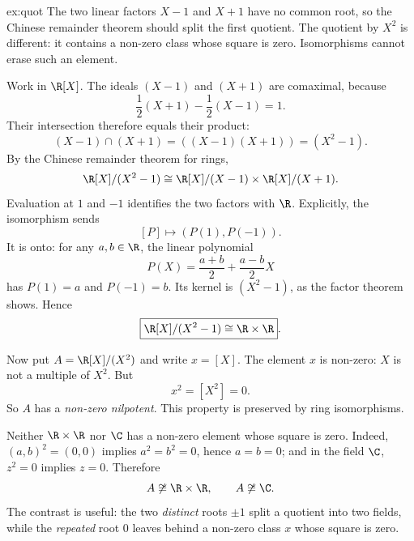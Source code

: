 \begin{solution}{ex:quot}
\idea The two linear factors $X-1$ and $X+1$ have no common root, so the Chinese remainder theorem should split the first quotient. The quotient by $X^2$ is different: it contains a non-zero class whose square is zero. Isomorphisms cannot erase such an element.

\writeup Work in $\R[X]$. The ideals $(X-1)$ and $(X+1)$ are comaximal, because
\[
\frac12(X+1)-\frac12(X-1)=1.
\]
Their intersection therefore equals their product:
\[
(X-1)\cap(X+1)=((X-1)(X+1))=(X^2-1).
\]
By the Chinese remainder theorem for rings,
\[
\R[X]/(X^2-1)
\cong\R[X]/(X-1)\times\R[X]/(X+1).
\]
Evaluation at $1$ and $-1$ identifies the two factors with $\R$. Explicitly, the isomorphism sends
\[
[P]\longmapsto(P(1),P(-1)).
\]
It is onto: for any $a,b\in\R$, the linear polynomial
\[
P(X)=\frac{a+b}2+\frac{a-b}2X
\]
has $P(1)=a$ and $P(-1)=b$. Its kernel is $(X^2-1)$, as the factor theorem shows. Hence
\[
\boxed{\R[X]/(X^2-1)\cong\R\times\R}.
\]

Now put $A=\R[X]/(X^2)$ and write $x=[X]$. The element $x$ is non-zero: $X$ is not a multiple of $X^2$. But
\[
x^2=[X^2]=0.
\]
So $A$ has a \emph{non-zero nilpotent}. This property is preserved by ring isomorphisms.

Neither $\R\times\R$ nor $\C$ has a non-zero element whose square is zero. Indeed, $(a,b)^2=(0,0)$ implies $a^2=b^2=0$, hence $a=b=0$; and in the field $\C$, $z^2=0$ implies $z=0$. Therefore
\[
A\not\cong\R\times\R,\qquad A\not\cong\C.
\]
The contrast is useful: the two \emph{distinct} roots $\pm1$ split a quotient into two fields, while the \emph{repeated} root $0$ leaves behind a non-zero class $x$ whose square is zero.
\end{solution}

